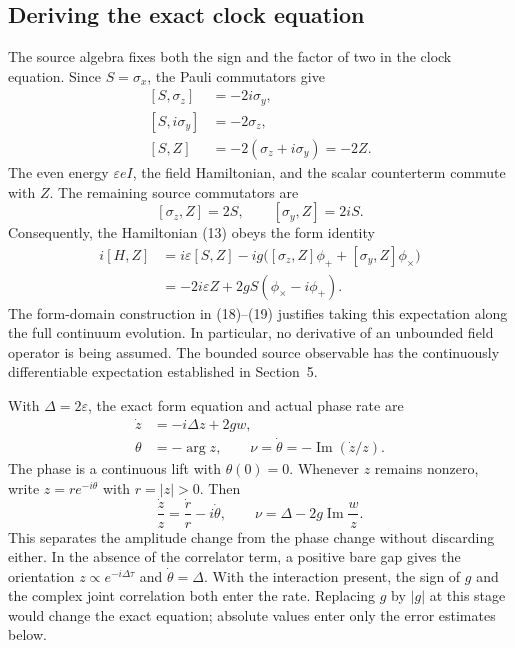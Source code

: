\documentclass[10pt,twocolumn,letterpaper]{article}
\begin{document}
\subsection{Deriving the exact clock equation}
The source algebra fixes both the sign and the factor of two in the clock equation. Since $S=\sigma_x$, the Pauli commutators give
\[
\begin{aligned}
[S,\sigma_z]&=-2i\sigma_y,\\
[S,i\sigma_y]&=-2\sigma_z,\\
[S,Z]&=-2(\sigma_z+i\sigma_y)=-2Z.
\end{aligned}
\]
The even energy $\varepsilon eI$, the field Hamiltonian, and the scalar counterterm commute with $Z$. The remaining source commutators are
\[
[\sigma_z,Z]=2S,\qquad [\sigma_y,Z]=2iS.
\]
Consequently, the Hamiltonian (13) obeys the form identity
\[
\begin{aligned}
i[H,Z]
&=i\varepsilon[S,Z]
 -ig\bigl([\sigma_z,Z]\phi_+
             +[\sigma_y,Z]\phi_\times\bigr)\\
&=-2i\varepsilon Z+2gS(\phi_\times-i\phi_+).
\end{aligned}
\]
The form-domain construction in (18)--(19) justifies taking this expectation along the full continuum evolution. In particular, no derivative of an unbounded field operator is being assumed. The bounded source observable has the continuously differentiable expectation established in Section~5.

With $\Delta=2\varepsilon$, the exact form equation and actual phase rate are
\begin{equation}
\begin{aligned}
\dot z&=-i\Delta z+2gw,\\
\theta&=-\arg z,\qquad\nu=\dot\theta=-\operatorname{Im}(\dot z/z).
\end{aligned}\tag{22}\label{eq:clock-exact}
\end{equation}
The phase is a continuous lift with $\theta(0)=0$. Whenever $z$ remains nonzero, write $z=r e^{-i\theta}$ with $r=|z|>0$. Then
\[
\frac{\dot z}{z}=\frac{\dot r}{r}-i\dot\theta,
\qquad
\nu=\Delta-2g\operatorname{Im}\frac{w}{z}.
\]
This separates the amplitude change from the phase change without discarding either. In the absence of the correlator term, a positive bare gap gives the orientation $z\propto e^{-i\Delta\tau}$ and $\dot\theta=\Delta$. With the interaction present, the sign of $g$ and the complex joint correlation both enter the rate. Replacing $g$ by $|g|$ at this stage would change the exact equation; absolute values enter only the error estimates below.
\end{document}
